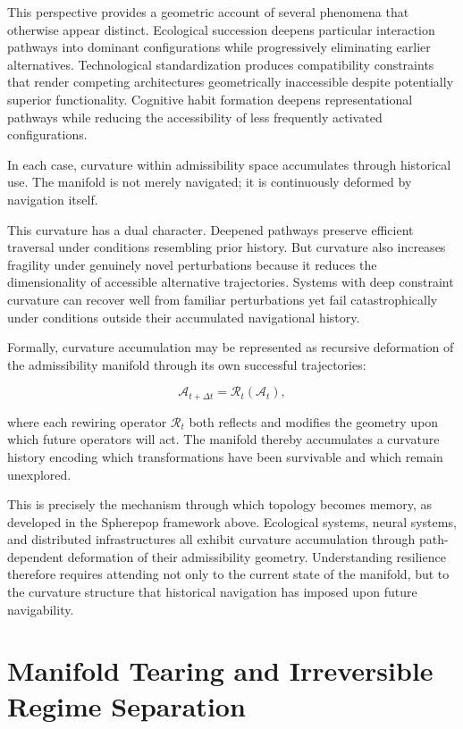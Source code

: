 \documentclass[11pt,a4paper]{article}
\newcommand{\Aspace}{\mathcal{A}}
\begin{document}
This perspective provides a geometric account of several phenomena that otherwise appear distinct. Ecological succession deepens particular interaction pathways into dominant configurations while progressively eliminating earlier alternatives. Technological standardization produces compatibility constraints that render competing architectures geometrically inaccessible despite potentially superior functionality. Cognitive habit formation deepens representational pathways while reducing the accessibility of less frequently activated configurations.

In each case, curvature within admissibility space accumulates through historical use. The manifold is not merely navigated; it is continuously deformed by navigation itself.

This curvature has a dual character. Deepened pathways preserve efficient traversal under conditions resembling prior history. But curvature also increases fragility under genuinely novel perturbations because it reduces the dimensionality of accessible alternative trajectories. Systems with deep constraint curvature can recover well from familiar perturbations yet fail catastrophically under conditions outside their accumulated navigational history.

Formally, curvature accumulation may be represented as recursive deformation of the admissibility manifold through its own successful trajectories:

\[
\Aspace_{t+\Delta t}
=
\mathcal{R}_t(\Aspace_t),
\]

where each rewiring operator $\mathcal{R}_t$ both reflects and modifies the geometry upon which future operators will act. The manifold thereby accumulates a curvature history encoding which transformations have been survivable and which remain unexplored.

This is precisely the mechanism through which topology becomes memory, as developed in the Spherepop framework above. Ecological systems, neural systems, and distributed infrastructures all exhibit curvature accumulation through path-dependent deformation of their admissibility geometry. Understanding resilience therefore requires attending not only to the current state of the manifold, but to the curvature structure that historical navigation has imposed upon future navigability.


\newpage

\section{Manifold Tearing and Irreversible Regime Separation}
\end{document}
